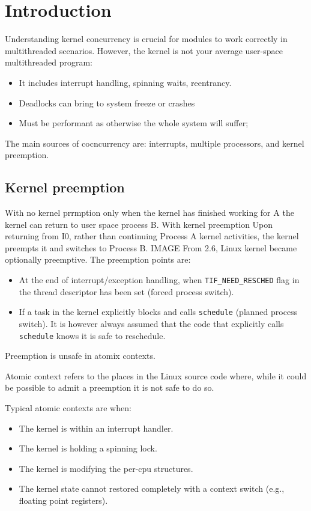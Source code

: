 \section{Introduction}

Understanding kernel concurrency is crucial for modules to work correctly in multithreaded scenarios.
However, the kernel is not your average user-space multithreaded program:
\begin{itemize}
    \item It includes interrupt handling, spinning waits, reentrancy.
    \item Deadlocks can bring to system freeze or crashes
    \item Must be performant as otherwise the whole system will suffer;
\end{itemize}
The main sources of cocncurrency are: interrupts, multiple processors, and kernel preemption. 

\subsection{Kernel preemption}
With no kernel prrmption only when the kernel has finished working for A the kernel can return to user space process B.
With kernel preemption Upon returning from I0, rather than continuing Process A kernel activities, the kernel preempts it and switches to Process B.
IMAGE 
From 2.6, Linux kernel became optionally preemptive.  
The preemption points are:
\begin{itemize}
    \item At the end of interrupt/exception handling, when \texttt{TIF\_NEED\_RESCHED} flag in the thread descriptor has been set (forced process switch). 
    \item If a task in the kernel explicitly blocks and calls \texttt{schedule} (planned process switch). 
        It is however always assumed that the code that explicitly calls \texttt{schedule} knows it is safe to reschedule.
\end{itemize}

Preemption is unsafe in atomix contexts.
\begin{definition}
    Atomic context refers to the places in the Linux source code where, while it could be possible to admit a preemption it is not safe to do so.
\end{definition}
Typical atomic contexts are when: 
\begin{itemize}
    \item The kernel is within an interrupt handler.
    \item The kernel is holding a spinning lock.
    \item The kernel is modifying the per-cpu structures.
    \item The kernel state cannot restored completely with a context switch (e.g., floating point registers).
\end{itemize}

